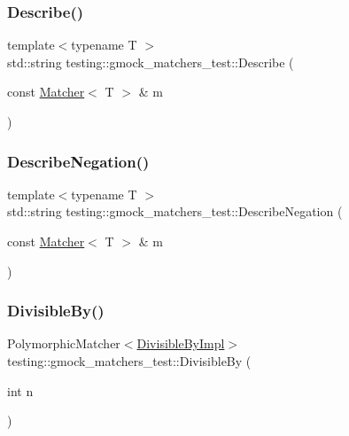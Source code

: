 \subsubsection{\texorpdfstring{Describe()}{Describe()}}
{\footnotesize\ttfamily template$<$typename T $>$ \\
std\+::string testing\+::gmock\+\_\+matchers\+\_\+test\+::\+Describe (\begin{DoxyParamCaption}\item[{const \mbox{\hyperlink{classtesting_1_1Matcher}{Matcher}}$<$ T $>$ \&}]{m }\end{DoxyParamCaption})}

\mbox{\label{namespacetesting_1_1gmock__matchers__test_a96c18b92dede79060a7303fe5d178faf}} 
\subsubsection{\texorpdfstring{DescribeNegation()}{DescribeNegation()}}
{\footnotesize\ttfamily template$<$typename T $>$ \\
std\+::string testing\+::gmock\+\_\+matchers\+\_\+test\+::\+Describe\+Negation (\begin{DoxyParamCaption}\item[{const \mbox{\hyperlink{classtesting_1_1Matcher}{Matcher}}$<$ T $>$ \&}]{m }\end{DoxyParamCaption})}

\mbox{\label{namespacetesting_1_1gmock__matchers__test_ac5b1fd3b6a8141c7e83ef6040ed4630f}} 
\subsubsection{\texorpdfstring{DivisibleBy()}{DivisibleBy()}}
{\footnotesize\ttfamily Polymorphic\+Matcher$<$\mbox{\hyperlink{classtesting_1_1gmock__matchers__test_1_1DivisibleByImpl}{Divisible\+By\+Impl}}$>$ testing\+::gmock\+\_\+matchers\+\_\+test\+::\+Divisible\+By (\begin{DoxyParamCaption}\item[{int}]{n }\end{DoxyParamCaption})}

